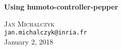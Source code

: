 \begin{titlepage}
\begin{center}

{\huge \bfseries Using humoto-controller-pepper}

\vspace{2cm} 

\textsc{Jan Michalczyk} \\

\texttt{jan.michalczyk@inria.fr} \\[2cm] 

{January 2, 2018}

\vspace{2cm} 

\end{center}
\end{titlepage}
